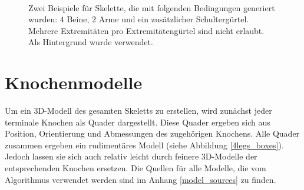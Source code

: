 \begin{figure}
 ~
 
 \caption{Zwei Beispiele für Skelette, die mit folgenden Bedingungen generiert wurden: $4$ Beine, $2$ Arme und ein zusätzlicher Schultergürtel. Mehrere Extremitäten pro Extremitätengürtel sind nicht erlaubt. Als Hintergrund wurde \cite{background} verwendet.}
 \label{zentauren}
\end{figure}

\section{Knochenmodelle}
\label{bone_models}

Um ein 3D-Modell des gesamten Skeletts zu erstellen, wird zunächst jeder terminale Knochen als Quader dargestellt. Diese Quader ergeben sich aus Position, Orientierung und Abmessungen des zugehörigen Knochens. Alle Quader zusammen ergeben ein rudimentäres Modell (siehe Abbildung \ref{4legs_boxes}). Jedoch lassen sie sich auch relativ leicht durch feinere 3D-Modelle der entsprechenden Knochen ersetzen. Die Quellen für alle Modelle, die vom Algorithmus verwendet werden sind im Anhang \ref{model_sources} zu finden.

